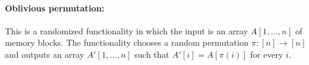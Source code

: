 \paragraph{Oblivious permutation:} 
This is a randomized functionality in which the input is an array $A[1,\ldots,n]$ of memory blocks. The functionality chooses a random permutation $\pi:[n] \rightarrow [n]$ and outputs an array $A'[1,\ldots,n]$ such that $A'[i] = A[\pi(i)]$ for every $i$. %


%
%
%
%
